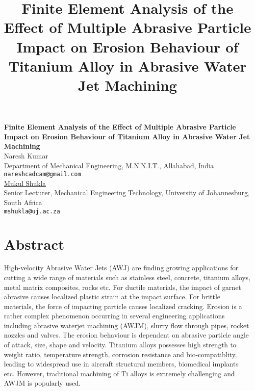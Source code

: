 \title{Finite Element Analysis of the Effect of Multiple Abrasive Particle Impact on Erosion Behaviour of Titanium Alloy in Abrasive Water Jet Machining}
\author{} \institute{}

\begin{center}

\textbf{\Large Finite Element Analysis of the Effect of Multiple Abrasive Particle Impact on Erosion Behaviour of Titanium Alloy in Abrasive Water Jet Machining}\\
\vspace{10mm}
{\large Naresh Kumar}\\
Department of Mechanical Engineering, M.N.N.I.T., Allahabad, India\\
{\tt nareshcadcam@gmail.com}\\
\vspace{4mm}
{\large \underline{Mukul Shukla}}\\
Senior Lecturer, Mechanical Engineering Technology, University of Johannesburg, South Africa\\
{\tt mshukla@uj.ac.za}

\end{center}

\section*{Abstract}

High-velocity Abrasive Water Jets (AWJ) are finding growing applications for cutting a wide range of materials such as stainless steel, concrete, titanium alloys, metal matrix composites, rocks etc. For ductile materials, the impact of garnet abrasive causes localized plastic strain at the impact surface. For brittle materials, the force of impacting particle causes localized cracking. Erosion is a rather complex phenomenon occurring in several engineering applications including abrasive waterjet machining (AWJM), slurry flow through pipes, rocket nozzles and valves. The erosion behaviour is dependent on abrasive particle angle of attack, size, shape and velocity. Titanium alloys possesses high strength to weight ratio, temperature strength, corrosion resistance and bio-compatiblity, leading to widespread use in aircraft structural members, biomedical implants etc. However, traditional machining of Ti alloys is extremely challenging and AWJM is popularly used.

